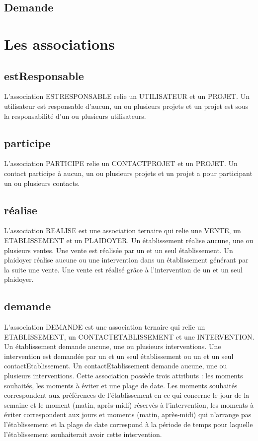 \documentclass[asi, sansVersion]{picInsa}
\begin{document}
\subsection*{Demande}


\section{Les associations}

\subsection*{estResponsable}
L'association ESTRESPONSABLE relie un UTILISATEUR et un PROJET. Un utilisateur est responsable d'aucun, un ou plusieurs projets et un projet est sous la responsabilité d'un ou plusieurs utilisateurs.

\subsection*{participe}
L'association PARTICIPE relie un CONTACTPROJET et un PROJET. Un contact participe à aucun, un ou plusieurs projets et un projet a pour participant un ou plusieurs contacts.

\subsection*{réalise}

L'association REALISE est une association ternaire qui relie une VENTE, un ETABLISSEMENT et un PLAIDOYER. Un établissement réalise aucune, une ou plusieurs ventes. Une vente est réalisée par un et un seul établissement. Un plaidoyer réalise aucune ou une intervention dans un établissement générant par la suite une vente. Une vente est réalisé grâce à l'intervention de un et un seul plaidoyer.


\subsection*{demande}

L'association DEMANDE est une association ternaire qui relie un ETABLISSEMENT, un CONTACTETABLISSEMENT et une INTERVENTION. Un établissement demande aucune, une ou plusieurs interventions. Une intervention est demandée par un et un seul établissement ou un et un seul contactEtablissement. Un contactEtablissement demande aucune, une ou plusieurs interventions. Cette association possède trois attributs : les moments souhaités, les moments à éviter et une plage de date. Les moments souhaités correspondent aux préférences de l'établissement en ce qui concerne le jour de la semaine et le moment (matin, après-midi) réservés à l'intervention, les moments à éviter correspondent aux jours et moments (matin, après-midi) qui n'arrange pas l'établissement et la plage de date correspond à la période de temps pour laquelle l'établissement souhaiterait avoir cette intervention. 
\end{document}
